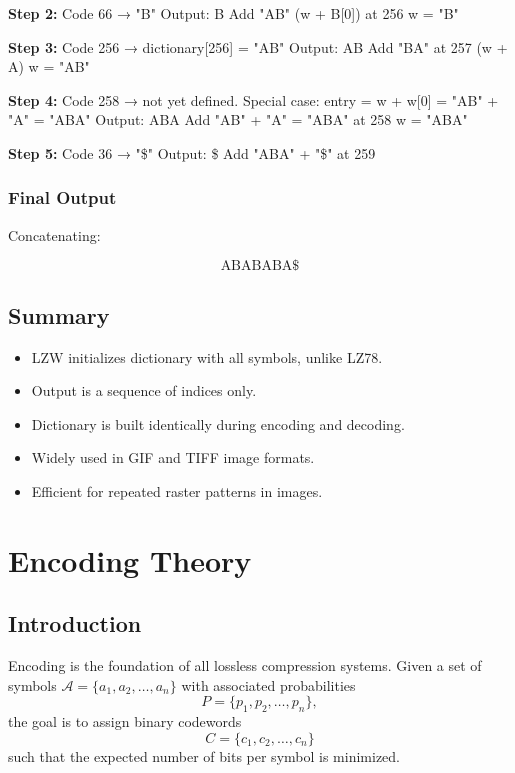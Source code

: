 \documentclass{AnantDocumentation}
\begin{document}
\textbf{Step 2:}  
Code 66 → "B"  
Output: B  
Add "AB" (w + B[0]) at 256  
w = "B"

\textbf{Step 3:}  
Code 256 → dictionary[256] = "AB"  
Output: AB  
Add "BA" at 257 (w + A)  
w = "AB"

\textbf{Step 4:}  
Code 258 → not yet defined.  
Special case: entry = w + w[0] = "AB" + "A" = "ABA"  
Output: ABA  
Add "AB" + "A" = "ABA" at 258  
w = "ABA"

\textbf{Step 5:}  
Code 36 → "\$"  
Output: \$  
Add "ABA" + "\$" at 259  

\subsubsection*{Final Output}

Concatenating:

\[
\boxed{\text{ABABABA\$}}
\]

\subsection{Summary}

\begin{itemize}
\item LZW initializes dictionary with all symbols, unlike LZ78.
\item Output is a sequence of indices only.
\item Dictionary is built identically during encoding and decoding.
\item Widely used in GIF and TIFF image formats.
\item Efficient for repeated raster patterns in images.
\end{itemize}

\section{Encoding Theory}

\subsection{Introduction}

Encoding is the foundation of all lossless compression systems.  
Given a set of symbols \( \mathcal{A} = \{a_1, a_2, \ldots, a_n\} \) with associated probabilities
\[
P = \{p_1, p_2, \ldots, p_n\},
\]
the goal is to assign binary codewords
\[
C = \{c_1, c_2, \ldots, c_n\}
\]
such that the expected number of bits per symbol is minimized.
\end{document}
